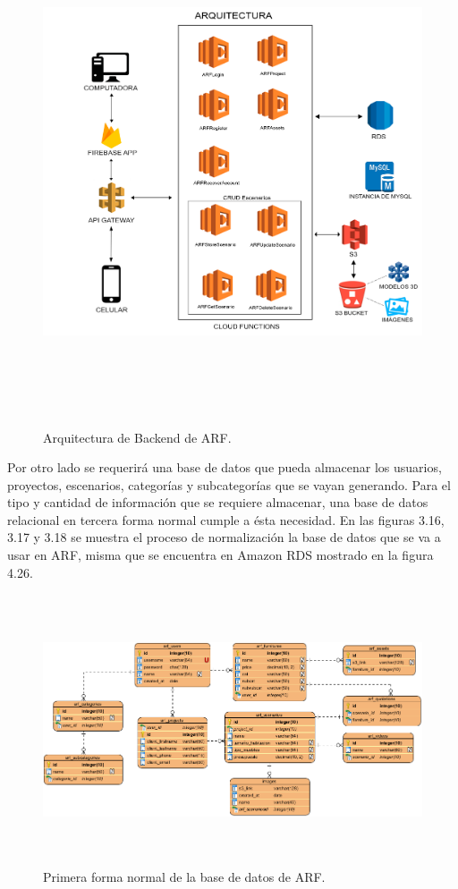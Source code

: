 \begin{figure}[H]
	\centering
	\includegraphics[width=15cm,height=15cm]{imagenes/desarrollo/arquitectura/ArchitecturaBackend.png}
	\caption{Arquitectura de Backend de ARF.}
	\label{fig:arqbackend}
\end{figure}
\par
Por otro lado se requerirá una base de datos que pueda almacenar los usuarios, proyectos, escenarios, categorías y subcategorías que se vayan generando. Para el tipo y cantidad de información que se requiere almacenar, una base de datos relacional en tercera forma normal cumple a ésta necesidad. En las figuras  3.16, 3.17 y 3.18 se muestra el proceso de normalización la base de datos que se va a usar en ARF, misma que se encuentra en Amazon RDS mostrado en la figura 4.26.
\begin{figure}[H]
	\centering
	\includegraphics[width=16cm,height=8cm]{imagenes/desarrollo/arquitectura/ERD.png}
	\caption{Primera forma normal de la base de datos de ARF.}
	\label{fig:erd1}
\end{figure}
